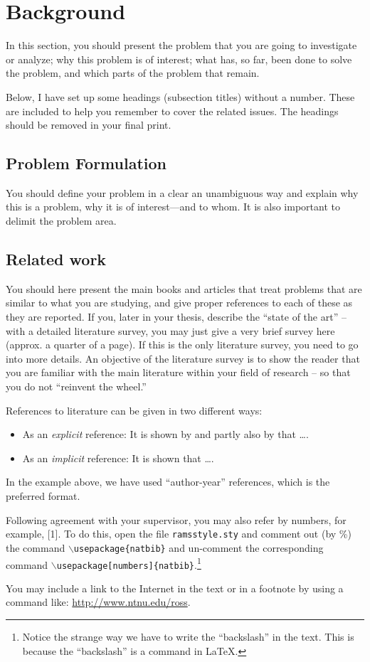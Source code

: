 \section{Background}
In this section, you should present the problem that you are going to investigate or analyze; why this problem is of interest; what has, so far, been done to solve the problem, and which parts of the problem that remain.

{\color{red}Below, I have set up some headings (subsection titles) without a number. These are included to help you remember to cover the related issues. The headings should be removed in your final print.}
\subsection*{Problem Formulation}
You should define your problem in a clear an unambiguous way and explain why this is a problem, why it is of interest---and to whom. It is also important to delimit the problem area.
\subsection*{Related work}
You should here present the main books and articles that treat problems that are similar to what  you are studying, and give proper references to each of these as they are reported. If you,  later in your thesis, describe the ``state of the art'' -- with a detailed literature survey, you may just give a very brief survey here (approx. a quarter of a page). If this is the only literature survey, you need to go into more details. An objective of the literature survey is to show the reader that you are familiar with the main literature within your field of research -- so that you do not ``reinvent the wheel.''


References to literature can be given in two different ways:
\begin{itemize}
\item As an \emph{explicit} reference: It is shown by \citet{lundteigen08} and partly also by \citet{rausand14}  that \ldots.
\item As an \emph{implicit} reference: It is shown \citep[e.g., see][Chap. 4]{rausand04} that \ldots.
\end{itemize}
In the example above, we have used ``author-year'' references, which is the preferred format. 
\begin{remark}
Following agreement with your supervisor, you may also refer by numbers, for example,  [1]. To do this, open the file \texttt{ramsstyle.sty} and  comment out (by \%) the command \texttt{$\backslash$usepackage\{natbib\}} and un-comment the corresponding command \texttt{$\backslash$usepackage[numbers]\{natbib\}}.\footnote{Notice the strange way we have to write the ``backslash'' in the text. This is because the ``backslash'' is a command in \LaTeX.}
\end{remark}
 You may include a link to the Internet in the text or in a footnote by using a command like: \url{http://www.ntnu.edu/ross}. 

